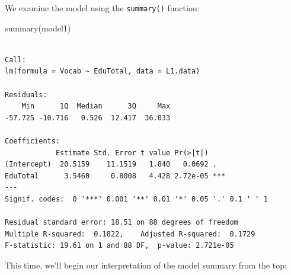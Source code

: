 \documentclass[
  letterpaper,
  DIV=11,
  numbers=noendperiod]{scrreprt}
\newenvironment{Shaded}{\begin{snugshade}}{\end{snugshade}}
\newcommand{\FunctionTok}[1]{\textcolor[rgb]{0.28,0.35,0.67}{#1}}
\newcommand{\NormalTok}[1]{\textcolor[rgb]{0.00,0.23,0.31}{#1}}
\begin{document}
We examine the model using the \texttt{summary()} function:

\begin{Shaded}
\begin{Highlighting}[]
\FunctionTok{summary}\NormalTok{(model1)}
\end{Highlighting}
\end{Shaded}

\begin{verbatim}

Call:
lm(formula = Vocab ~ EduTotal, data = L1.data)

Residuals:
    Min      1Q  Median      3Q     Max 
-57.725 -10.716   0.526  12.417  36.033 

Coefficients:
            Estimate Std. Error t value Pr(>|t|)    
(Intercept)  20.5159    11.1519   1.840   0.0692 .  
EduTotal      3.5460     0.8008   4.428 2.72e-05 ***
---
Signif. codes:  0 '***' 0.001 '**' 0.01 '*' 0.05 '.' 0.1 ' ' 1

Residual standard error: 18.51 on 88 degrees of freedom
Multiple R-squared:  0.1822,    Adjusted R-squared:  0.1729 
F-statistic: 19.61 on 1 and 88 DF,  p-value: 2.721e-05
\end{verbatim}

This time, we'll begin our interpretation of the model summary from the
top:
\end{document}
